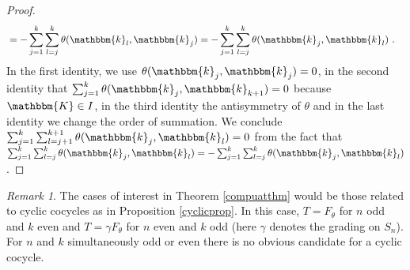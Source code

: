 \documentclass[10pt]{amsart}
\theoremstyle{remark}
\newtheorem{remark}[thm]{Remark}
\theoremstyle{definition}
\begin{document}
\begin{proof}
\begin{align*}
&=-\sum_{j=1}^k\sum_{l=j}^{k}\theta(\mathbbm{k}_{l}, \mathbbm{k}_j)=-\sum_{j=1}^k\sum_{l=j}^{k}\theta(\mathbbm{k}_{j}, \mathbbm{k}_l)\ .
\end{align*}
In the first identity, we use $\theta(\mathbbm{k}_j,\mathbbm{k}_j)=0$, in the second identity that $\sum_{j=1}^k\theta(\mathbbm{k}_j,\mathbbm{k}_{k+1})=0$ because $\mathbbm{K}\in I$, in the third identity the antisymmetry of $\theta$ and in the last identity we change the order of summation. We conclude $\sum_{j=1}^k\sum_{l=j+1}^{k+1}\theta(\mathbbm{k}_{j}, \mathbbm{k}_l)=0$ from the fact that $\sum_{j=1}^k\sum_{l=j}^{k}\theta(\mathbbm{k}_{j}, \mathbbm{k}_l)=-\sum_{j=1}^k\sum_{l=j}^{k}\theta(\mathbbm{k}_{j},\mathbbm{k}_l)$.
\end{proof}

\begin{remark}
The cases of interest in Theorem \ref{compuatthm} would be those related to cyclic cocycles as in Proposition \ref{cyclicprop}. In this case, $T=F_\theta$ for $n$ odd and $k$ even and $T=\gamma F_\theta$ for $n$ even and $k$ odd (here $\gamma$ denotes the grading on $S_n$). For $n$ and $k$ simultaneously odd or even there is no obvious candidate for a cyclic cocycle.
\end{remark}
\end{document}
